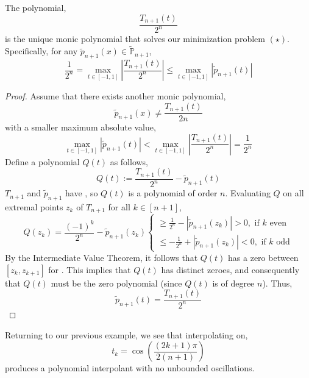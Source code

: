 \begin{thm}
    The polynomial,
    \[\frac{T_{n+1}(t)}{2^n}\]
    is the unique monic polynomial that solves our minimization problem $(\star)$. Specifically, for any $\tilde{p}_{n+1}(x) \in \tilde{\mathbb{P}}_{n+1}$, 
    \[\frac{1}{2^n}=\max _{t \in[-1,1]}\left|\frac{T_{n+1}(t)}{2^n}\right| \leq \max _{t \in[-1,1]}\left|\tilde{p}_{n+1}(t)\right|\]
\end{thm}

\begin{proof}
    Assume that there exists another monic polynomial,
    \[\tilde{p}_{n+1}(x) \neq \frac{T_{n+1}(t)}{2 n}\]
    with a smaller maximum absolute value,
    \[\max _{t \in[-1,1]}\left|\tilde{p}_{n+1}(t)\right|<\max _{t \in[-1,1]}\left|\frac{T_{n+1}(t)}{2^n}\right|=\frac{1}{2^n}\]
    Define a polynomial $Q(t)$ as follows,
    \[Q(t):=\frac{T_{n+1}(t)}{2^n}-\tilde{p}_{n+1}(t)\]
    $T_{n+1}$ and $\tilde{p}_{n+1}$ have , so $Q(t)$ is a polynomial of order $n$. Evaluating $Q$ on all extremal points $z_k$ of $T_{n+1}$ for all \textbf{$k \in [n+1]$},
    \[
    Q\left(z_k\right)=\frac{(-1)^k}{2^n}-\tilde{p}_{n+1}\left(z_k\right)\left\{\begin{array}{c}
    \geq \frac{1}{2^n}-\left|\tilde{p}_{n+1}\left(z_k\right)\right|>0, \text { if } k \text { even} \\
    \leq-\frac{1}{2^n}+\left|\tilde{p}_{n+1}\left(z_k\right)\right|<0, \text { if } k \text { odd}
    \end{array}\right.
    \]
    By the Intermediate Value Theorem, it follows that $Q(t)$ has a zero between $\left[z_k, z_{k+1}\right]$ for . This implies that $Q(t)$ has  distinct zeroes, and consequently that $Q(t)$ must be the zero polynomial (since $Q(t)$ is of degree $n$). Thus,
    \[\tilde{p}_{n+1}(t)=\frac{T_{n+1}(t)}{2^n}\]
\end{proof}

\begin{marginfigure}
Returning to our previous example, we see that interpolating on,
\[t_k=\cos \left(\frac{(2 k+1) \pi}{2(n+1)}\right)\]
produces a polynomial interpolant with no unbounded oscillations.
\end{marginfigure}